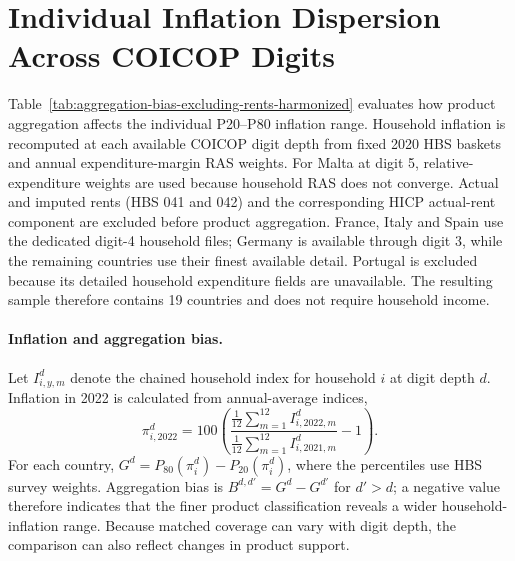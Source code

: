 \section{Individual Inflation Dispersion Across COICOP Digits}
\label{app:aggregation-bias}

Table~\ref{tab:aggregation-bias-excluding-rents-harmonized} evaluates how product aggregation
affects the individual P20--P80 inflation range. Household inflation is recomputed at each available
COICOP digit depth from fixed 2020 HBS baskets and annual expenditure-margin RAS weights. For
Malta at digit 5, relative-expenditure weights are used because household RAS does not converge.
Actual and imputed rents (HBS 041 and 042) and the corresponding HICP actual-rent component are excluded
before product aggregation. France, Italy and Spain use the dedicated digit-4 household files;
Germany is available through digit 3, while the remaining countries use their finest available
detail. Portugal is excluded because its detailed household expenditure fields are unavailable.
The resulting sample therefore contains 19 countries and does not require household income.

\paragraph{Inflation and aggregation bias.}
Let $I^d_{i,y,m}$ denote the chained household index for household $i$ at digit depth $d$.
Inflation in 2022 is calculated from annual-average indices,
\begin{equation}
 \pi^d_{i,2022}=100\left(
 \frac{\frac{1}{12}\sum_{m=1}^{12} I^d_{i,2022,m}}
 {\frac{1}{12}\sum_{m=1}^{12} I^d_{i,2021,m}}-1\right).
\end{equation}
For each country, $G^d=P_{80}(\pi^d_i)-P_{20}(\pi^d_i)$, where the percentiles use HBS survey
weights. Aggregation bias is $B^{d,d'}=G^d-G^{d'}$ for $d'>d$; a negative value therefore indicates
that the finer product classification reveals a wider household-inflation range. Because matched
coverage can vary with digit depth, the comparison can also reflect changes in product support.


